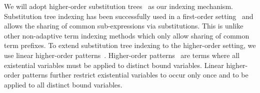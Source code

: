 \documentclass{llncs}
\begin{document}
We will adopt higher-order substitution
trees~\cite{Pientka:ICLP03,Pientka03phd} as our indexing mechanism.
Substitution tree indexing has been successfully used in a first-order
setting~\cite{Graf+Book95} and allows the sharing of common
sub-expressions via substitutions. This is unlike other non-adaptive
term indexing methods which only allow sharing of common term
prefixes. To extend substitution tree indexing to the higher-order
setting, we use linear higher-order
patterns~\cite{PientkaPfenning:CADE03}. Higher-order
patterns~\cite{Miller91iclp} are terms where all existential variables
must be applied to distinct bound variables. Linear higher-order
patterns further restrict existential variables to occur only once
and to be applied to all distinct bound variables.
\end{document}
